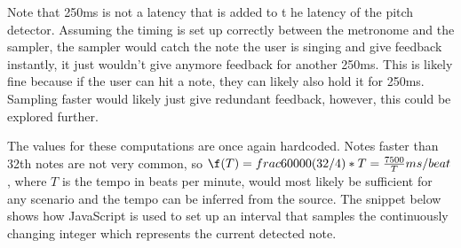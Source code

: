 Note that 250ms is not a latency that is added to t he latency of the pitch detector. Assuming the timing is set up correctly between the metronome and the sampler, the sampler would catch the note the user is singing and give feedback instantly, it just wouldn't give anymore feedback for another 250ms. This is likely fine because if the user can hit a note, they can likely also hold it for 250ms. Sampling faster would likely just give redundant feedback, however, this could be explored further. 

The values for these computations are once again hardcoded. Notes faster than 32th notes are not very common, so $\f(T) = frac{60000}{(32/4)*T} = \frac{7500}{T} ms/beat$, where $T$ is the tempo in beats per minute, would most likely be sufficient for any scenario and the tempo can be inferred from the source. The snippet below shows how JavaScript is used to set up an interval that samples the continuously changing integer which represents the current detected note.


